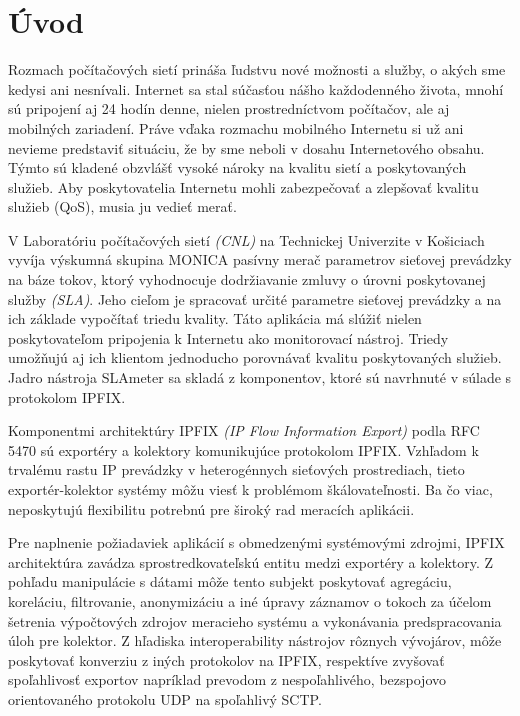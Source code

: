 \setcounter{page}{1}
\setcounter{equation}{0}
\setcounter{figure}{0}
\setcounter{table}{0}

\section*{\'Uvod}

Rozmach počítačových sietí prináša ľudstvu nové možnosti a služby, o akých sme kedysi ani nesnívali.
Internet sa stal súčasťou nášho každodenného života, mnohí sú pripojení aj 24 hodín denne, nielen 
prostredníctvom počítačov, ale aj mobilných zariadení. Práve vďaka rozmachu mobilného Internetu si už
ani nevieme predstaviť situáciu, že by sme neboli v dosahu Internetového obsahu. Týmto sú kladené 
obzvlášť vysoké nároky na kvalitu sietí a poskytovaných služieb. Aby poskytovatelia Internetu mohli 
zabezpečovať a zlepšovať kvalitu služieb (QoS), musia ju vedieť merať.

V Laboratóriu počítačových sietí \emph{(CNL)} na Technickej Univerzite v Košiciach vyvíja výskumná 
skupina MONICA pasívny merač parametrov sieťovej prevádzky na báze tokov, ktorý vyhodnocuje 
dodržiavanie zmluvy o úrovni poskytovanej služby \emph{(SLA)}. Jeho cieľom je spracovať určité parametre 
sieťovej prevádzky a na ich základe vypočítať triedu kvality. Táto aplikácia má slúžiť nielen poskytovateľom 
pripojenia k Internetu ako monitorovací nástroj. Triedy umožňujú aj ich klientom jednoducho 
porovnávať kvalitu poskytovaných služieb. Jadro nástroja SLAmeter sa skladá z komponentov, ktoré sú 
navrhnuté v súlade s protokolom IPFIX.

Komponentmi architektúry IPFIX \emph{(IP Flow Information Export)} podla RFC 5470 \citep{rfc5470}
sú exportéry a kolektory komunikujúce protokolom IPFIX. Vzhľadom k trvalému rastu IP prevádzky
v heterogénnych sieťových prostrediach, tieto exportér-kolektor systémy môžu viesť k problémom 
škálovateľnosti. Ba čo viac, neposkytujú flexibilitu potrebnú pre široký rad meracích aplikácii.

Pre naplnenie požiadaviek aplikácií s obmedzenými systémovými zdrojmi, IPFIX architektúra zavádza 
sprostredkovateľskú entitu medzi exportéry a kolektory. Z pohľadu manipulácie s dátami môže tento subjekt 
poskytovať agregáciu, koreláciu, filtrovanie, anonymizáciu a iné úpravy záznamov o tokoch za účelom 
šetrenia výpočtových zdrojov meracieho systému a vykonávania predspracovania úloh pre kolektor. Z hľadiska
interoperability nástrojov rôznych vývojárov, môže poskytovať konverziu z iných protokolov na IPFIX, 
respektíve zvyšovať spoľahlivosť exportov napríklad prevodom z nespoľahlivého, bezspojovo orientovaného 
protokolu UDP na spoľahlivý SCTP. \citep{rfc6183}

